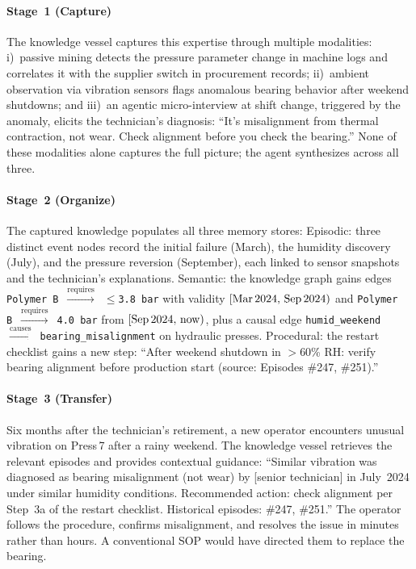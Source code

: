 \documentclass[]{ceurart}
\begin{document}
\paragraph{Stage~1 (Capture)} The knowledge vessel captures this
expertise through multiple modalities: i)~passive mining
detects the pressure parameter change in machine logs and correlates it
with the supplier switch in procurement records; ii)~ambient
observation via vibration sensors flags anomalous bearing behavior
after weekend shutdowns; and iii)~an agentic micro-interview at
shift change, triggered by the anomaly, elicits the technician's
diagnosis: ``It's misalignment from thermal contraction, not wear.
Check alignment before you check the bearing.'' None of these modalities
alone captures the full picture; the agent synthesizes across all three.

\paragraph{Stage~2 (Organize)} The captured knowledge populates all
three memory stores:
Episodic: three distinct event nodes record the initial failure
(March), the humidity discovery (July), and the pressure reversion
(September), each linked to sensor snapshots and the technician's
explanations.
Semantic: the knowledge graph gains edges
\texttt{Polymer\,B}~$\xrightarrow{\text{requires}}$~\texttt{${\leq}$3.8\,bar}
with validity $[\text{Mar\,2024},\,\text{Sep\,2024})$ and
\texttt{Polymer\,B}~$\xrightarrow{\text{requires}}$~\texttt{4.0\,bar}
from $[\text{Sep\,2024},\,\text{now})$, plus a causal edge
\texttt{humid\_weekend}~$\xrightarrow{\text{causes}}$~\texttt{bearing\_misalignment}
on hydraulic presses.
Procedural: the restart checklist gains a new step: ``After
weekend shutdown in $>$60\% RH: verify bearing alignment before
production start (source: Episodes \#247, \#251).''

\paragraph{Stage~3 (Transfer)} Six months after the technician's
retirement, a new operator encounters unusual vibration on Press\,7
after a rainy weekend. The knowledge vessel retrieves the relevant
episodes and provides contextual guidance: ``Similar vibration was
diagnosed as bearing misalignment (not wear) by [senior technician]
in July~2024 under similar humidity conditions. Recommended action:
check alignment per Step~3a of the restart checklist. Historical
episodes: \#247, \#251.'' The operator follows the procedure, confirms
misalignment, and resolves the issue in minutes rather than hours. A
conventional SOP would have directed them to replace the bearing.
\end{document}
